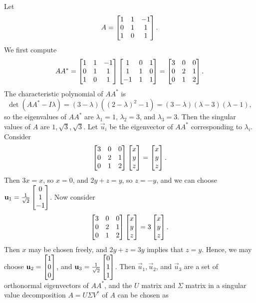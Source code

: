 \documentclass{homework}
\begin{document}
\begin{alphaparts}
		\questionpart Let
		\begin{equation*}
			A = \left[\begin{matrix}1 & 1 & -1\\ 0& 1& 1 \\ 1 & 0 &1\end{matrix}\right].
		\end{equation*}
		We first compute
		\begin{equation*}
			AA^* = \left[\begin{matrix}1 & 1 & -1\\ 0& 1& 1 \\ 1 & 0 &1\end{matrix}\right]\left[\begin{matrix}1 & 0 &1 \\ 1&1&0\\-1&1&1\end{matrix}\right] = \left[\begin{matrix}3 & 0 & 0 \\ 0 & 2 & 1\\ 0 & 1 & 2\end{matrix}\right].
		\end{equation*}
		The characteristic polynomial of $AA^*$ is
		\begin{equation*}
			\det(AA^*-I\lambda) = (3-\lambda)((2-\lambda)^2-1) = (3-\lambda)(\lambda - 3)(\lambda - 1),
		\end{equation*}
		so the eigenvalues of $AA^*$ are $\lambda_1 =1$, $\lambda_2= 3$, and $\lambda_3=3$. Then the singular values of $A$ are $1, \sqrt{3}, \sqrt{3}$. Let $\vec{u}_i$ be the eigenvector of $AA^*$ corresponding to $\lambda_i$. Consider
		\begin{equation*}
			\left[\begin{matrix}3 & 0 & 0 \\ 0 & 2 & 1 \\ 0 & 1 & 2\end{matrix}\right]\left[\begin{matrix}x\\y\\z\end{matrix}\right] = \left[\begin{matrix}x\\y\\z\end{matrix}\right].
		\end{equation*}
		Then $3x = x$, so $x = 0$, and $2y + z = y$, so $z = -y$, and we can choose $\mathbf{u}_1 = \frac{1}{\sqrt{2}}\left[\begin{matrix}0\\1\\-1\end{matrix}\right]$. Now consider
		\begin{equation*}
			\left[\begin{matrix}3 & 0 & 0 \\ 0 & 2 & 1 \\ 0 & 1 & 2\end{matrix}\right]\left[\begin{matrix}x\\y\\z\end{matrix}\right] = 3\left[\begin{matrix}x\\y\\z\end{matrix}\right].
		\end{equation*}
		Then $x$ may be chosen freely, and $2y + z = 3y$ implies that $z = y$. Hence, we may choose $\mathbf{u}_2 = \left[\begin{matrix}1\\0\\0\end{matrix}\right]$, and $\mathbf{u}_3 = \frac{1}{\sqrt{2}}\left[\begin{matrix}0\\1\\1\end{matrix}\right]$. Then $\vec{u}_1, \vec{u}_2$, and $\vec{u}_3$ are a set of orthonormal eigenvectors of $AA^*$, and the $U$ matrix and $\Sigma$ matrix in a singular value decomposition $A =U\Sigma V^*$ of $A$ can be chosen as

\end{alphaparts}
\end{document}
